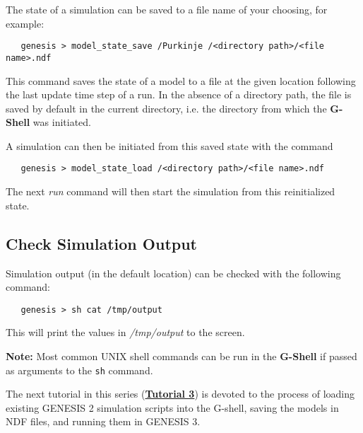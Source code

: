 \documentclass[12pt]{article}
\begin{document}
The state of a simulation can be saved to a file name of your choosing, for example:
\begin{verbatim}
   genesis > model_state_save /Purkinje /<directory path>/<file name>.ndf
\end{verbatim}
This command saves the state of a model to a file at the given location following the last update time step of a run. In the absence of a directory path, the file is saved by default in the current directory, i.e. the directory from which the {\bf G-Shell} was initiated.

A simulation can then be initiated from this saved 
state with the command 
\begin{verbatim}
   genesis > model_state_load /<directory path>/<file name>.ndf 
\end{verbatim}
The next {\it run} command will then start the simulation from this reinitialized state.

\subsection*{Check Simulation Output}

Simulation output (in the default location) can be checked with the following command:
\begin{verbatim}
   genesis > sh cat /tmp/output
\end{verbatim}
This will print the values in {\it /tmp/output} to the screen.

{\bf Note:} Most common UNIX shell commands can be run in the {\bf G-Shell} if passed as arguments to the {\tt sh} command.

The next tutorial in this series (\href{../tutorial3/tutorial3.html}{\bf Tutorial 3}) is devoted to the process of
loading existing GENESIS 2 simulation scripts into the G-shell, saving the
models in NDF files, and running them in GENESIS 3.
\end{document}
